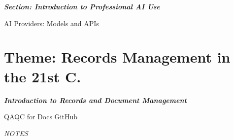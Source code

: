 \documentclass[12pt, letterpaper]{article}
\begin{document}
\large
\begin{flushleft}
\textbf{\textit{Section: Introduction to Professional AI Use}}
\end{flushleft}
\normalsize

\begin{outline}[enumerate]
\1 AI Providers: Models and APIs
\2 

\end{outline}


\section{Theme: Records Management in the 21st C.}
\large
\begin{flushleft}
\textbf{\textit{Introduction to Records and Document Management}}
\end{flushleft}
\normalsize

\begin{outline}[enumerate]
\1 QAQC for Docs
\1 GitHub

\end{outline}

\pagebreak

\thispagestyle{plain} 

\large
\begin{flushleft}
\textit{NOTES}
\end{flushleft}
\normalsize
\end{document}
